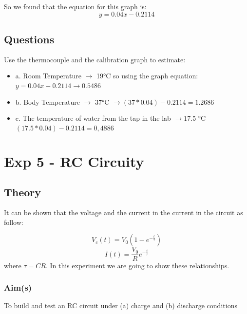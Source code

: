 \documentclass[a4paper]{article}
\begin{document}
        So we found that the equation for this graph is:
        \[y = 0.04x - 0.2114\]

\subsection{Questions}

Use the thermocouple and the calibration graph to estimate:

\begin{itemize}
    \item a. Room Temperature $\rightarrow$ 19°C so using the graph equation:  $y = 0.04x - 0.2114 \rightarrow 0.5486$ 
    \item b. Body Temperature $\rightarrow$ 37°C $\rightarrow (37 * 0.04) - 0.2114 = 1.2686$
    \item c. The temperature of water from the tap in the lab $\rightarrow 17.5$ °C $(17.5 * 0.04) - 0.2114 = 0,4886 $ 
\end{itemize}

\section{Exp 5 - RC Circuity}

\subsection{Theory}

It can be shown that the voltage and the current in the current in the circuit as follow:

\[V_c(t) = V_0 (1 - e^{-\frac{t}{\tau}})\]
\[I(t) = \frac{V_0}{R}e^{-\frac{t}{\tau}}\]
where $\tau = CR$.
In this experiment we are going to show these relationships.


\subsubsection{Aim(s)}

To build and test an RC circuit under (a) charge and (b) discharge conditions
\end{document}
